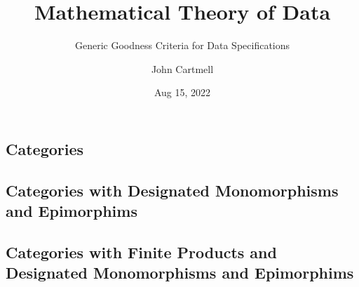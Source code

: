 
\usepackage{mathptmx}
\usepackage{amsfonts}
\usepackage{wasysym}
\usepackage{url}
\usepackage{hyperref}

\newcommand{\sharedmacros}{../../SharedMacros}










\renewcommand{\erpictureFolder}[0]{../../SharedPictures}
\setcounter{equation}{0}





\title[John Cartmell]{Mathematical Theory of Data}
\subtitle{Generic Goodness Criteria for Data Specifications}
\author{John Cartmell}
\institute{\\}
\date{Aug 15, 2022}

\usepackage{framed}
\usepackage{bibentry}
\usepackage{colortbl}
\usepackage{ulem}   %
\usepackage{listings}
\usepackage{arydshln} %
\usepackage{pst-arrow} %




\newcommand{\slidecontext}{Introduction} %

\newcommand{\comingnext}[1]{
\begin{frame}{COMING NEXT}
\begin{center}
\Large #1
\end{center}
\end{frame}
}



\subsection{Categories}



\subsection{Categories with Designated Monomorphisms and Epimorphims}


\subsection{Categories with Finite Products and Designated Monomorphisms and Epimorphims}



